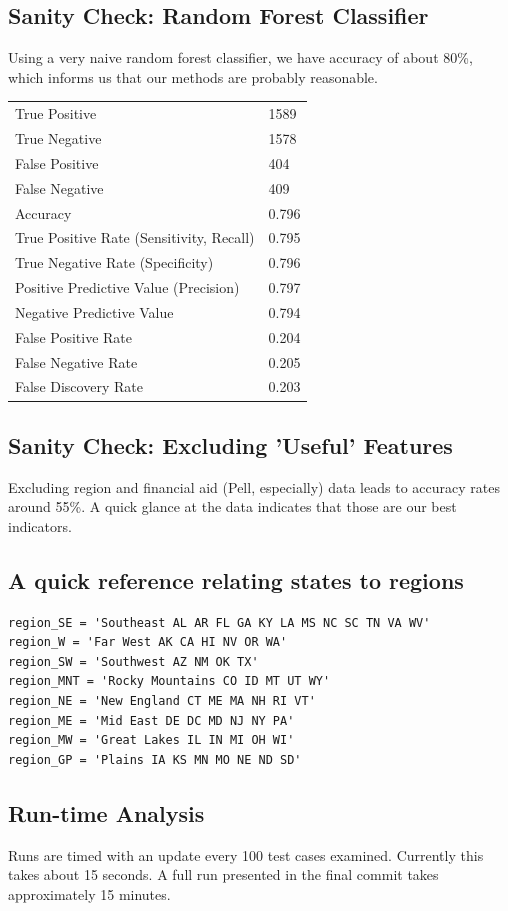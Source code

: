 \documentclass[12pt, a4, epsf] {article}
\theoremstyle{plain}
\theoremstyle{definition}
\begin{document}
\subsection*{Sanity Check: Random Forest Classifier}
Using a very naive random forest classifier, we have accuracy of about 80\%, which informs us that our methods are probably reasonable.
\begin{table}[htbp]
\begin{tabular}{ll}
True Positive                            & 1589  \\
True Negative                            & 1578  \\
False Positive                           & 404   \\
False Negative                           & 409   \\
Accuracy                                 & 0.796 \\
True Positive Rate (Sensitivity, Recall) & 0.795 \\
True Negative Rate (Specificity)         & 0.796 \\
Positive Predictive Value (Precision)    & 0.797 \\
Negative Predictive Value                & 0.794 \\
False Positive Rate                      & 0.204 \\
False Negative Rate                      & 0.205 \\
False Discovery Rate                     & 0.203
\end{tabular}
\end{table}
\subsection*{Sanity Check: Excluding 'Useful' Features}
Excluding region and financial aid (Pell, especially) data leads to accuracy rates around 55\%. A quick glance at the data indicates that those are our best indicators. 
\subsection*{A quick reference relating states to regions}
\begin{verbatim}
region_SE = 'Southeast AL AR FL GA KY LA MS NC SC TN VA WV'
region_W = 'Far West AK CA HI NV OR WA'
region_SW = 'Southwest AZ NM OK TX'
region_MNT = 'Rocky Mountains CO ID MT UT WY'
region_NE = 'New England CT ME MA NH RI VT'
region_ME = 'Mid East DE DC MD NJ NY PA'
region_MW = 'Great Lakes IL IN MI OH WI'
region_GP = 'Plains IA KS MN MO NE ND SD'
\end{verbatim}
\subsection*{Run-time Analysis}
Runs are timed with an update every 100 test cases examined. Currently this takes about 15 seconds. A full run presented in the final commit takes approximately 15 minutes.
\end{document}
